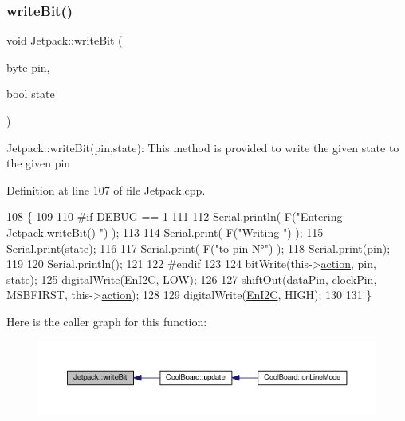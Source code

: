 \subsubsection{\texorpdfstring{write\+Bit()}{writeBit()}}
{\footnotesize\ttfamily void Jetpack\+::write\+Bit (\begin{DoxyParamCaption}\item[{byte}]{pin,  }\item[{bool}]{state }\end{DoxyParamCaption})}

Jetpack\+::write\+Bit(pin,state)\+: This method is provided to write the given state to the given pin 

Definition at line 107 of file Jetpack.\+cpp.


\begin{DoxyCode}
108 \{
109 
110 \textcolor{preprocessor}{#if DEBUG == 1 }
111 
112     Serial.println( F(\textcolor{stringliteral}{"Entering Jetpack.writeBit() "}) );
113 
114     Serial.print( F(\textcolor{stringliteral}{"Writing "}) );
115     Serial.print(state);
116 
117     Serial.print( F(\textcolor{stringliteral}{"to pin N°"}) );
118     Serial.print(pin);
119 
120     Serial.println();
121 
122 \textcolor{preprocessor}{#endif}
123 
124     bitWrite(this->\hyperlink{class_jetpack_aca3142925a7b0834b34ae91d26af7765}{action}, pin, state);
125     digitalWrite(\hyperlink{class_jetpack_a81df984fb4cea98c71aa1a1cfcdfe814}{EnI2C}, LOW);
126     
127     shiftOut(\hyperlink{class_jetpack_a3d669a56e93c71dd25f970d4ed7d0c00}{dataPin}, \hyperlink{class_jetpack_a58ebb991f358f3ae94e82148b0221b5a}{clockPin}, MSBFIRST, this->\hyperlink{class_jetpack_aca3142925a7b0834b34ae91d26af7765}{action});
128 
129     digitalWrite(\hyperlink{class_jetpack_a81df984fb4cea98c71aa1a1cfcdfe814}{EnI2C}, HIGH);
130 
131 \}
\end{DoxyCode}
Here is the caller graph for this function\+:\nopagebreak
\begin{figure}[H]
\begin{center}
\leavevmode
\includegraphics[width=350pt]{df/d1d/class_jetpack_a79ae7bc3c1828a0551a7c005c4f8bd00_icgraph}
\end{center}
\end{figure}


